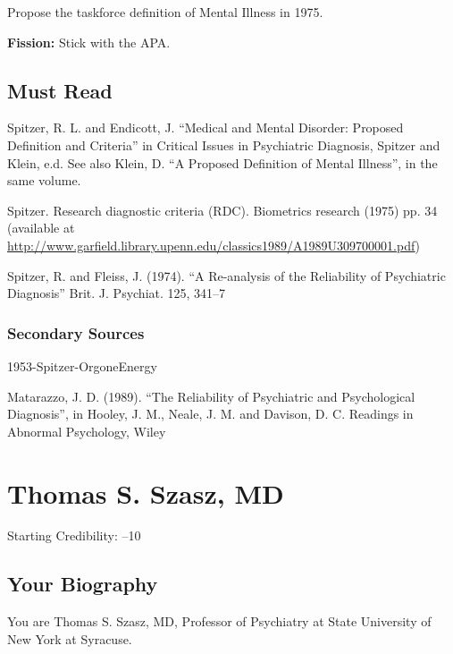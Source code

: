 \begin{refsection}
Propose the taskforce definition of Mental Illness in 1975.

\textbf{Fission:} Stick with the APA.

\section{Must Read}
\label{mustread}

Spitzer, R. L. and Endicott, J. “Medical and Mental Disorder: Proposed Definition and Criteria” in Critical Issues in Psychiatric Diagnosis, Spitzer and Klein, e.d. See also Klein, D. “A Proposed Definition of Mental Illness”, in the same volume.

Spitzer. Research diagnostic criteria (RDC). Biometrics research (1975) pp. 34 (available at \url{http://www.garfield.library.upenn.edu/classics1989/A1989U309700001.pdf})

Spitzer, R. and Fleiss, J. (1974). “A Re-analysis of the Reliability of Psychiatric Diagnosis” Brit. J. Psychiat. 125, 341--7

\subsection{Secondary Sources}
\label{secondarysources}

1953-Spitzer-OrgoneEnergy

Matarazzo, J. D. (1989). “The Reliability of Psychiatric and Psychological Diagnosis”, in Hooley, J. M., Neale, J. M. and Davison, D. C. Readings in Abnormal Psychology, Wiley

\chapter{Thomas S. Szasz, MD}
\label{thomass.szaszmd}

Starting Credibility: --10

\section{Your Biography}
\label{yourbiography}

You are Thomas S. Szasz, MD, Professor of Psychiatry at State University of New York at Syracuse.


\end{refsection}
